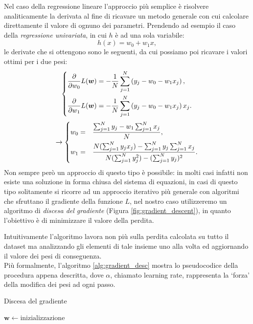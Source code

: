 \documentclass[../../main.tex]{subfiles}
\begin{document}
    Nel caso della regressione lineare l'approccio più semplice è risolvere analiticamente la derivata al fine di ricavare un metodo generale con cui calcolare direttamente il valore di ognuno dei parametri. Prendendo ad esempio il caso della \textit{regressione univariata}, in cui $h$ è ad una sola variabile:
    \[h(x) = w_0 + w_1 x ,\]
    le derivate che si ottengono sono le seguenti, da cui possiamo poi ricavare i valori ottimi per i due pesi:
    \begin{equation}
        \begin{dcases}
            \frac{\partial}{\partial w_0} L(\boldsymbol{w}) = -\frac{1}{N}\sum_{j=1}^N\left(y_j - w_0 - w_1 x_j\right),\\
            \frac{\partial}{\partial w_1} L(\boldsymbol{w}) = -\frac{1}{N}\sum_{j=1}^N\left(y_j - w_0 - w_1 x_j\right) x_j.
        \end{dcases}   
        \label{eqn:regrLineareDer}      
    \end{equation}
    \[
    \rightarrow
    \begin{dcases}
        w_0 = & \frac{\sum_{j=1}^N y_j - w_1 \sum_{j=1}^N x_j}{N},\\
        w_1 = & \frac{N(\sum_{j=1}^N y_jx_j) - \sum_{j=1}^N y_j \sum_{j=1}^N x_j}{N(\sum_{j=1}^N y_j^2) - (\sum_{j=1}^N y_j)^2}. 
    \end{dcases}    
    \]
    Non sempre però un approccio di questo tipo è possibile: in molti casi infatti non esiste una soluzione in forma chiusa del sistema di equazioni, in casi di questo tipo solitamente si ricorre ad un approccio iterativo più generale con algoritmi che sfruttano il gradiente della funzione $L$, nel nostro caso utilizzeremo un algoritmo di \textit{discesa del gradiente} (Figura \ref{fig:gradient_descent}), in quanto l'obiettivo è di minimizzare il valore della perdita.

    Intuitivamente l'algoritmo lavora non più sulla perdita calcolata su tutto il dataset ma analizzando gli elementi di tale insieme uno alla volta ed aggiornando il valore dei pesi di conseguenza.\\
    Più formalmente, l'algoritmo \ref{alg:gradient_desc} mostra lo pseudocodice della procedura appena descritta, dove $\alpha$, chiamato learning rate, rappresenta la `forza' della modifica dei pesi ad ogni passo.

    \begin{algorithm}[H]
        \caption{Discesa del gradiente}\label{alg:gradient_desc}
        \begin{algorithmic}
            \State $\boldsymbol{w} \gets \text{inizializzazione}$
            \EndWhile
        \end{algorithmic}
    \end{algorithm}  
\end{document}

